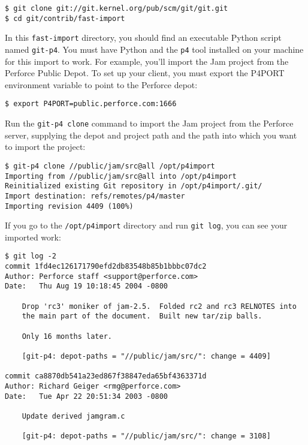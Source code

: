 \documentclass[a4paper]{book}
\newcounter{tab}[chapter]
\begin{document}
\begin{shaded}\begin{verbatim}
$ git clone git://git.kernel.org/pub/scm/git/git.git
$ cd git/contrib/fast-import
\end{verbatim}\end{shaded}

In this \texttt{fast-import} directory, you should find an executable Python script named \texttt{git-p4}. You must have Python and the \texttt{p4} tool installed on your machine for this import to work. For example, you'll import the Jam project from the Perforce Public Depot. To set up your client, you must export the P4PORT environment variable to point to the Perforce depot:

\begin{shaded}\begin{verbatim}
$ export P4PORT=public.perforce.com:1666
\end{verbatim}\end{shaded}

Run the \texttt{git-p4 clone} command to import the Jam project from the Perforce server, supplying the depot and project path and the path into which you want to import the project:

\begin{shaded}\begin{verbatim}
$ git-p4 clone //public/jam/src@all /opt/p4import
Importing from //public/jam/src@all into /opt/p4import
Reinitialized existing Git repository in /opt/p4import/.git/
Import destination: refs/remotes/p4/master
Importing revision 4409 (100%)
\end{verbatim}\end{shaded}

If you go to the \texttt{/opt/p4import} directory and run \texttt{git log}, you can see your imported work:

\begin{shaded}\begin{verbatim}
$ git log -2
commit 1fd4ec126171790efd2db83548b85b1bbbc07dc2
Author: Perforce staff <support@perforce.com>
Date:   Thu Aug 19 10:18:45 2004 -0800

    Drop 'rc3' moniker of jam-2.5.  Folded rc2 and rc3 RELNOTES into
    the main part of the document.  Built new tar/zip balls.

    Only 16 months later.

    [git-p4: depot-paths = "//public/jam/src/": change = 4409]

commit ca8870db541a23ed867f38847eda65bf4363371d
Author: Richard Geiger <rmg@perforce.com>
Date:   Tue Apr 22 20:51:34 2003 -0800

    Update derived jamgram.c

    [git-p4: depot-paths = "//public/jam/src/": change = 3108]
\end{verbatim}\end{shaded}
\end{document}
